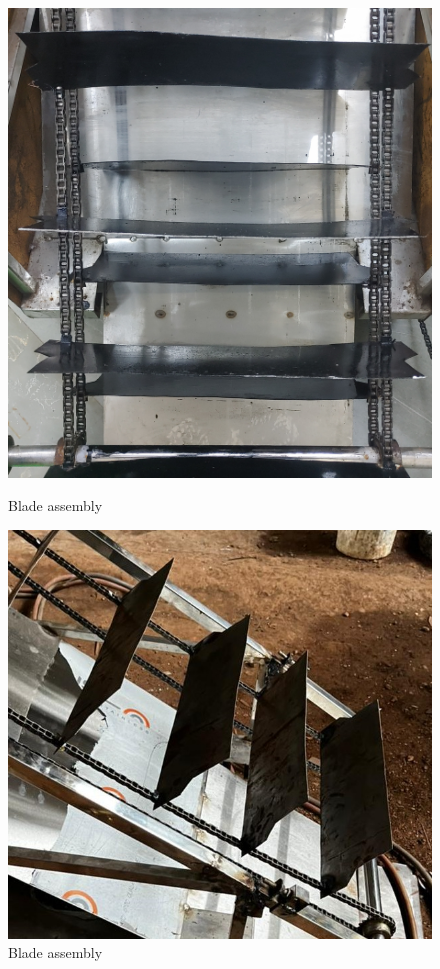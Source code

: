 \begin{figure}[H]
  \centering
    \begin{minipage}{0.36\textwidth}
    \centering
      \includegraphics[width=1\textwidth]{Blades ass 2.jpg}
       \caption{Blade assembly}
    \label{Blade ass}
    \end{minipage}
\hfill
    \begin{minipage}{0.40\textwidth}
    \centering
      \includegraphics[width=1\textwidth]{Blades ass.jpg}
      \caption{Blade assembly}
      \label{Blades ass}
    \end{minipage}
\end{figure} 

